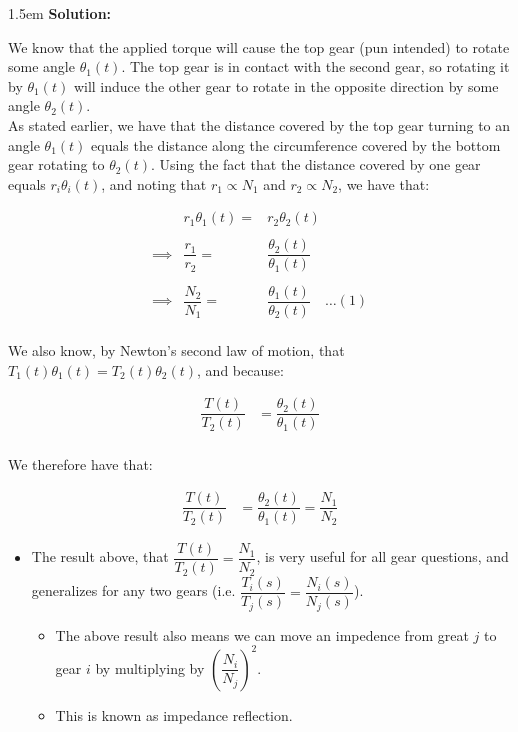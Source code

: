 \documentclass{article}
\newenvironment{solution}{
	\vspace{.5em}
	\par
	\begin{adjustwidth}{1.5em}{}
	\textbf{{Solution:}}
	\par
	\vspace{.5em}
}{
	\vspace{1em}
	\end{adjustwidth}
}
\begin{document}
\begin{solution}
	We know that the applied torque will cause the top gear (pun intended) to rotate some angle $\theta_1(t)$. The top gear is in contact with the second gear, so rotating it by $\theta_1(t)$ will induce the other gear to rotate in the opposite direction by some angle $\theta_2(t)$. \\

	As stated earlier, we have that the distance covered by the top gear turning to an angle $\theta_1(t)$ equals the distance along the circumference covered by the bottom gear rotating to $\theta_2(t)$. Using the fact that the distance covered by one gear equals $r_i \theta_i(t)$, and noting that $r_1 \propto N_1$ and $r_2 \propto N_2$, we have that:

	\begin{equation*}
		\begin{array}{lrl}
			& r_1 \theta_1(t) =& r_2 \theta_2(t) \\\\
			\implies & \dfrac{r_1}{r_2} =& \dfrac{\theta_2(t)}{\theta_1(t)} \\\\
			\implies & \dfrac{N_2}{N_1} =& \dfrac{\theta_1(t)}{\theta_2(t)} \quad \ldots (1)
		\end{array}
	\end{equation*} \\

	We also know, by Newton's second law of motion, that $T_1(t) \theta_1(t) = T_2(t) \theta_2(t)$, and because:

	\begin{align*}
		\dfrac{T(t)}{T_2(t)} &= \dfrac{\theta_2(t)}{\theta_1(t)} \\
	\end{align*}

	We therefore have that:

	\begin{align*}
		\dfrac{T(t)}{T_2(t)} &= \dfrac{\theta_2(t)}{\theta_1(t)} = \dfrac{N_1}{N_2}
	\end{align*}
\end{solution}

\begin{itemize}
	\item The result above, that $\dfrac{T(t)}{T_2(t)} = \dfrac{N_1}{N_2}$, is very useful for all gear questions, and generalizes for any two gears (i.e. $\dfrac{T_i(s)}{T_j(s)} = \dfrac{N_i(s)}{N_j(s)}$).
	\begin{itemize}
		\item The above result also means we can move an impedence from great $j$ to gear $i$ by multiplying by $\left(\dfrac{N_i}{N_j}\right)^2$. \item This is known as impedance reflection.
	\end{itemize}
\end{itemize}
\end{document}
